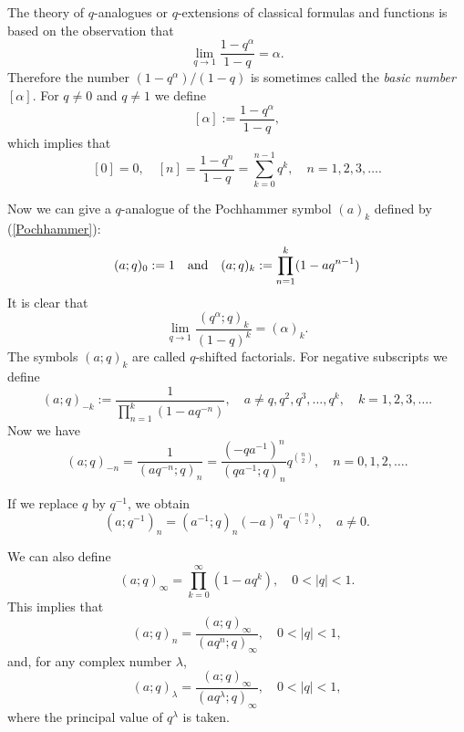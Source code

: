 \documentclass[envcountchap,graybox]{svmono}
\begin{document}
The theory of $q$-analogues or $q$-extensions of classical formulas and
functions is based on the observation that
$$\lim\limits_{q\rightarrow 1}\frac{1-q^{\alpha}}{1-q}=\alpha.$$
Therefore the number $(1-q^{\alpha})/(1-q)$ is sometimes called the
\emph{basic number} $[\alpha]$. For $q\neq 0$ and $q\neq 1$ we define
\begin{equation}
\label{basic}
[\alpha]:=\frac{1-q^{\alpha}}{1-q},
\end{equation}
which implies that
\begin{equation}
\label{basicdef}
[0]=0,\quad [n]=\frac{1-q^n}{1-q}=\sum_{k=0}^{n-1}q^k,\quad n=1,2,3,\ldots.
\end{equation}

Now we can give a $q$-analogue of the Pochhammer symbol $(a)_k$ defined by
(\ref{Pochhammer}):
\begin{equation}
\label{qsh}\index{q-Shifted factorial@$q$-Shifted factorial}
(a;q)_0:=1\quad\textrm{and}\quad (a;q)_k:=\prod_{n=1}^k(1-aq^{n-1})
\end{equation}
It is clear that
\begin{equation}
\label{limitqsh}
\lim\limits_{q\rightarrow 1}\frac{(q^{\alpha};q)_k}{(1-q)^k}=(\alpha)_k.
\end{equation}
The symbols $(a;q)_k$ are called $q$-shifted factorials. For negative subscripts we define
\begin{equation}
\label{qsh1}
(a;q)_{-k}:=\frac{1}{\displaystyle\prod_{n=1}^{k}(1-aq^{-n})},\quad a\neq q,q^2,q^3,\ldots,q^k,
\quad k=1,2,3,\ldots.
\end{equation}
Now we have
\begin{equation}
\label{qsh2}
(a;q)_{-n}=\frac{1}{(aq^{-n};q)_n}=\frac{(-qa^{-1})^n}{(qa^{-1};q)_n}
q^{\binom{n}{2}},\quad n=0,1,2,\ldots.
\end{equation}

If we replace $q$ by $q^{-1}$, we obtain
\begin{equation}
\label{qsh3}
(a;q^{-1})_n=(a^{-1};q)_n(-a)^nq^{-\binom{n}{2}},\quad a\neq 0.
\end{equation}

We can also define
$$(a;q)_{\infty}=\prod_{k=0}^{\infty}(1-aq^k),\quad 0<|q|<1.$$
This implies that
\begin{equation}
\label{qsh4}
(a;q)_n=\frac{(a;q)_{\infty}}{(aq^n;q)_{\infty}},\quad 0<|q|<1,
\end{equation}
and, for any complex number $\lambda$,
\begin{equation}
\label{qsh5}
(a;q)_{\lambda}=\frac{(a;q)_{\infty}}{(aq^{\lambda};q)_{\infty}},\quad 0<|q|<1,
\end{equation}
where the principal value of $q^{\lambda}$ is taken.
\end{document}
